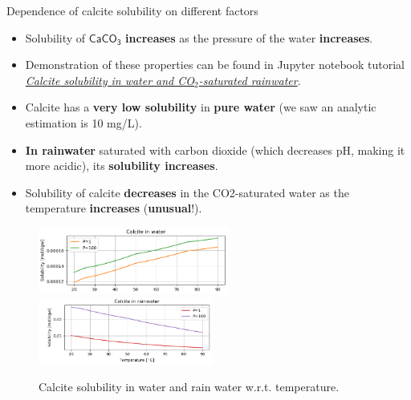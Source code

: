 \begin{frame}{Dependence of calcite solubility on different factors}
\small
\begin{itemize}
\item Solubility of $\mathsf{CaCO_3}$ \textbf{increases} as the pressure of the water \textbf{increases}.
\pause
\item Demonstration of these properties can be found in Jupyter notebook tutorial 
\href{}{\textcolor{indigo(dye)}{\it Calcite solubility in water and CO$_2$-saturated rainwater}}.
%
\pause
\item Calcite has a \textbf{very low solubility} in \textbf{pure water} (we saw an analytic estimation is 10 \mbox{mg/L}).
\pause
\item \textbf{In rainwater} saturated with carbon dioxide (which decreases pH, making it more acidic), its \textbf{solubility increases}.
%
%
\pause
\item Solubility of calcite \textbf{decreases} in the CO2-saturated water  as the temperature \textbf{increases} ({\bf unusual}!).
\end{itemize}

\begin{figure}\centering
	\includegraphics[height=2.2cm]{figures/chemical-equilibrium/calcite-solubility-water.png} \quad
	\includegraphics[height=2.2cm]{figures/chemical-equilibrium/calcite-solubility-rainwater.png}
	\caption*{\footnotesize Calcite solubility in water and rain water w.r.t. temperature.}
\end{figure}
\end{frame}

